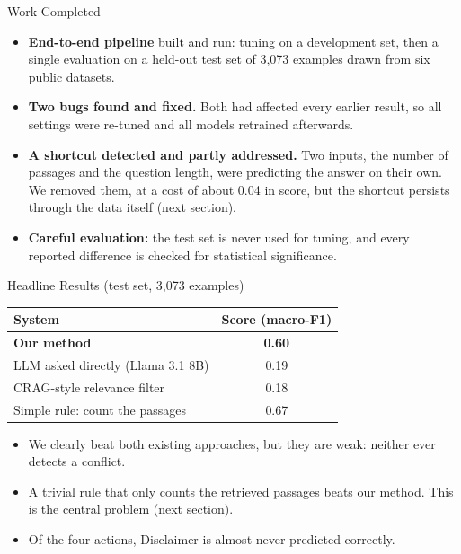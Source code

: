 \documentclass[aspectratio=169]{beamer}
\begin{document}
\begin{frame}{Work Completed}
  \begin{itemize}
    \item \textbf{End-to-end pipeline} built and run: tuning on a development set, then a single
      evaluation on a held-out test set of 3{,}073 examples drawn from six public datasets.
    \vspace{0.15cm}
    \item \textbf{Two bugs found and fixed.} Both had affected every earlier result, so all
      settings were re-tuned and all models retrained afterwards.
    \vspace{0.15cm}
    \item \textbf{A shortcut detected and partly addressed.} Two inputs, the number of passages
      and the question length, were predicting the answer on their own. We removed them, at a
      cost of about 0.04 in score, but the shortcut persists through the data itself
      (next section).
    \vspace{0.15cm}
    \item \textbf{Careful evaluation:} the test set is never used for tuning, and every
      reported difference is checked for statistical significance.
  \end{itemize}
\end{frame}

\begin{frame}{Headline Results (test set, 3{,}073 examples)}
  \begin{center}
    \begin{tabular}{lc}
      \toprule
      System & Score (macro-F1) \\
      \midrule
      \textbf{Our method} & \textbf{0.60} \\
      LLM asked directly (Llama 3.1 8B) & 0.19 \\
      CRAG-style relevance filter & 0.18 \\
      \midrule
      \alert{Simple rule: count the passages} & \alert{0.67} \\
      \bottomrule
    \end{tabular}
  \end{center}
  \vspace{0.2cm}
  \begin{itemize}
    \item We clearly beat both existing approaches, but they are weak: neither ever detects a
      conflict.
    \item A trivial rule that only counts the retrieved passages \alert{beats our method}.
      This is the central problem (next section).
    \item Of the four actions, Disclaimer is almost never predicted correctly.
  \end{itemize}
\end{frame}
\end{document}
